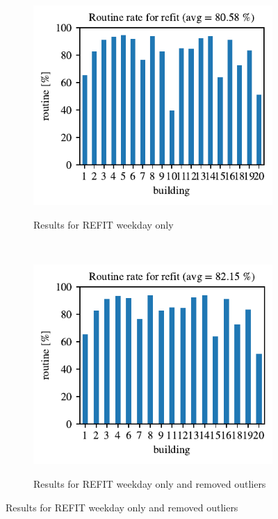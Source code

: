 \begin{figure}[H]
	\begin{subfigure}{.5\textwidth}
	\caption{Results for REFIT weekday only}
	\includegraphics[width=1\textwidth]{Figures/EC/refit_res_nw_1.pdf}
	\label{fig:refit_res_nw_1}
    \end{subfigure}
    ~
    \begin{subfigure}{.5\textwidth}
	\caption{Results for REFIT weekday only and removed outliers}
	\includegraphics[width=1\textwidth]{Figures/EC/refit_res_nw_2.pdf}
	\label{fig:refit_res_nw_2}
    \end{subfigure}
\end{figure}

